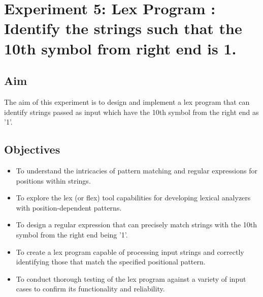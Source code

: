 \documentclass[12pt]{article}
\begin{document}
\newpage
\section*{Experiment 5: Lex Program : Identify the strings such that the 10th symbol from right end is 1.}

\subsection*{Aim}
The aim of this experiment is to design and implement a lex program that can identify strings passed as input which have the 10th symbol from the right end as '1'.

\subsection*{Objectives}
\begin{itemize}
    \item To understand the intricacies of pattern matching and regular expressions for positions within strings.
    \item To explore the lex (or flex) tool capabilities for developing lexical analyzers with position-dependent patterns.
    \item To design a regular expression that can precisely match strings with the 10th symbol from the right end being '1'.
    \item To create a lex program capable of processing input strings and correctly identifying those that match the specified positional pattern.
    \item To conduct thorough testing of the lex program against a variety of input cases to confirm its functionality and reliability.
\end{itemize}
\end{document}
